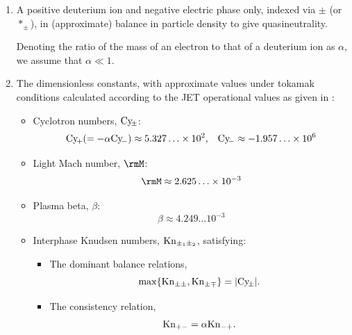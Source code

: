     \shortline

    \begin{enumerate}
        \item  A positive deuterium ion and negative electric phase only, indexed via $\pm$ (or $*_{\pm}$), in (approximate) balance in particle density to give quasineutrality.
        
        Denoting the ratio of the mass of an electron to that of a deuterium ion as $\alpha$, we assume that $\alpha  \ll  1$.

        \item  The dimensionless constants, with approximate values under tokamak conditions calculated according to the JET operational values as given in \cite{Wes00}:
        \begin{itemize}
            \item  Cyclotron numbers, $\mathrm{Cy}\!_{\pm}$:
            \begin{align}
                \mathrm{Cy}\!_{+}  (=  - \alpha\mathrm{Cy}\!_{-})  \approx    5.327\ldots\times 10^{2},  &&
                \mathrm{Cy}\!_{-}                          \approx  - 1.957\ldots\times 10^{6}
            \end{align}
            
            \item  Light Mach number, $\rmM$:
            \begin{equation}
                \rmM  \approx  2.625\ldots\times 10^{- 3}
            \end{equation}
            
            \item  Plasma beta, $\beta$:
            \begin{equation}
                \beta  \approx  4.249\ldots 10^{- 3}
            \end{equation}

            \item  Interphase Knudsen numbers, $\mathrm{Kn}_{\pm_{1}\pm_{2}}$, satisfying:
            \begin{itemize}
              \item  The dominant balance relations,
              \begin{equation}
                  \max\{\mathrm{Kn}_{\pm\pm},  \mathrm{Kn}_{\pm\mp}\}  =  |\mathrm{Cy}\!_{\pm}|.
              \end{equation}
              
              \item  The consistency relation,
              \begin{equation}
                  \mathrm{Kn}_{+-}  =  \alpha\mathrm{Kn}_{-+}.
              \end{equation}
            \end{itemize}
            

\end{itemize}
\end{enumerate}
